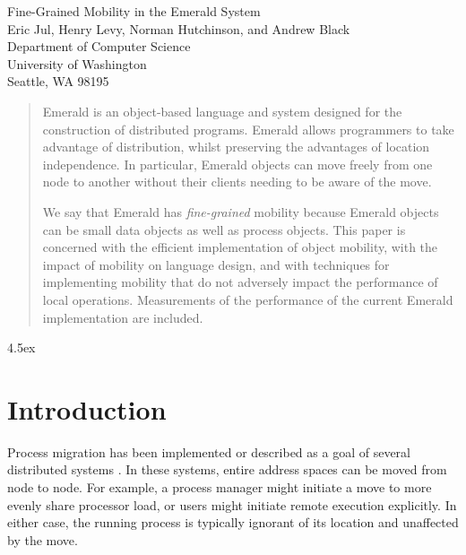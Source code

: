 

\newcommand{\assign}{\ifmmode\leftarrow\else$\leftarrow$\fi}

\begin{center}
\LARGE
Fine-Grained Mobility in the Emerald System \\
\large
\vspace{3ex}
Eric Jul, Henry Levy, Norman Hutchinson, and Andrew Black \\
\vspace{3ex}
Department of Computer Science \\
University of Washington \\
Seattle, WA 98195
\end{center}
\normalsize

\begin{abstract}

Emerald is an object-based language and system designed for the construction
of distributed programs.  Emerald allows programmers to take advantage of 
distribution, whilst preserving the advantages of location independence.
In particular, Emerald objects can move
freely from one node to another without their clients needing to be aware
of the move.

We say that Emerald
has {\em fine-grained} mobility because Emerald objects can
be small data objects as well as process objects.  This paper 
is concerned with the efficient implementation of object mobility, with the
impact of mobility on language design, 
and with
techniques for implementing mobility that do not adversely impact the
performance of local operations.  Measurements of the performance of the
current Emerald implementation are included.
\end{abstract}

\baselineskip 4.5ex

\section{Introduction}

Process migration has been implemented or described as a goal of
several distributed systems \cite{accent,butterfield84,powell83,theimer85}.
In these systems, entire address spaces can be moved from node to node.
For example, 
a process manager might 
initiate a move to more evenly share processor load, or users might
initiate remote execution explicitly.  In either case, the
running process is typically
ignorant of its location and unaffected by the move.  

